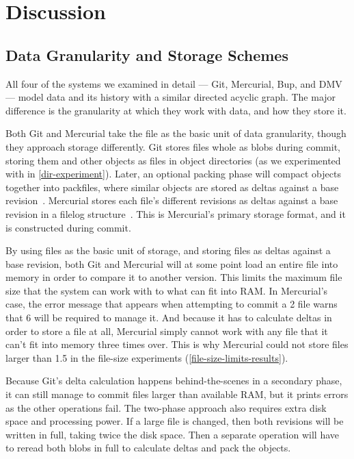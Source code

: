 \chapter{Discussion}


\section{Data Granularity and Storage Schemes}
\label{chunk-then-recombine}

All four of the systems we examined in detail --- Git, Mercurial, Bup, and
\gls{DMV} --- model data and its history with a similar directed acyclic graph.
The major difference is the granularity at which they work with data, and how
they store it.

Both Git and Mercurial take the file as the basic unit of data granularity,
though they approach storage differently. Git stores files whole as \glspl{blob}
during \gls{commit}, storing them and other objects as files in object
directories (as we experimented with in \autoref{dir-experiment}). Later, an
optional packing phase will compact objects together into \glspl{packfile},
where similar objects are stored as deltas against a base revision~\cite[Section
10.4]{git_book}. Mercurial stores each file's different revisions as deltas
   against a base revision in a \gls{filelog} structure~\cite[Chapter
   4]{hgbook}. This is Mercurial's primary storage format, and it is constructed
     during \gls{commit}.

By using files as the basic unit of storage, and storing files as deltas against
a base revision, both Git and Mercurial will at some point load an entire file
into memory in order to compare it to another version. This limits the maximum
file size that the system can work with to what can fit into RAM. In Mercurial's
case, the error message that appears when attempting to \gls{commit} a
\SI{2}{\gib} file warns that \SI{6}{\gib} will be required to manage it. And
because it has to calculate deltas in order to store a file at all, Mercurial
simply cannot work with any file that it can't fit into memory three times over.
This is why Mercurial could not store files larger than \SI{1.5}{\gib} in the
file-size experiments (\autoref{file-size-limits-results}).

Because Git's delta calculation happens behind-the-scenes in a secondary phase,
it can still manage to \gls{commit} files larger than available RAM, but it
prints errors as the other operations fail. The two-phase approach also requires
extra disk space and processing power. If a large file is changed, then both
revisions will be written in full, taking twice the disk space. Then a separate
operation will have to reread both \glspl{blob} in full to calculate deltas and
pack the objects.


